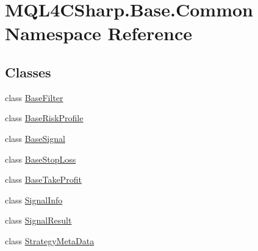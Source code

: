 \hypertarget{namespace_m_q_l4_c_sharp_1_1_base_1_1_common}{}\section{M\+Q\+L4\+C\+Sharp.\+Base.\+Common Namespace Reference}
\label{namespace_m_q_l4_c_sharp_1_1_base_1_1_common}
\subsection*{Classes}
\begin{DoxyCompactItemize}
\item 
class \hyperlink{class_m_q_l4_c_sharp_1_1_base_1_1_common_1_1_base_filter}{Base\+Filter}
\item 
class \hyperlink{class_m_q_l4_c_sharp_1_1_base_1_1_common_1_1_base_risk_profile}{Base\+Risk\+Profile}
\item 
class \hyperlink{class_m_q_l4_c_sharp_1_1_base_1_1_common_1_1_base_signal}{Base\+Signal}
\item 
class \hyperlink{class_m_q_l4_c_sharp_1_1_base_1_1_common_1_1_base_stop_loss}{Base\+Stop\+Loss}
\item 
class \hyperlink{class_m_q_l4_c_sharp_1_1_base_1_1_common_1_1_base_take_profit}{Base\+Take\+Profit}
\item 
class \hyperlink{class_m_q_l4_c_sharp_1_1_base_1_1_common_1_1_signal_info}{Signal\+Info}
\item 
class \hyperlink{class_m_q_l4_c_sharp_1_1_base_1_1_common_1_1_signal_result}{Signal\+Result}
\item 
class \hyperlink{class_m_q_l4_c_sharp_1_1_base_1_1_common_1_1_strategy_meta_data}{Strategy\+Meta\+Data}
\end{DoxyCompactItemize}
